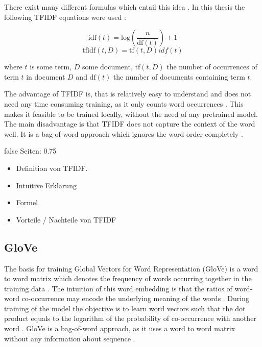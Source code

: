 \documentclass[draft,final,oneside]{vutinfth} %
\begin{document}
There exist many different formulas which entail this idea \cite{tfidf}. In this thesis the following TFIDF equations were used \cite{tfidf}:

\begin{equation}
\text{idf}(t) = \text{log} \left(\dfrac{n}{\text{df}(t)} \right) + 1
\end{equation}
\begin{equation}
\text{tfidf}(t, D) = \text{tf}(t, D)idf(t)
\end{equation}


where $t$ is some term, $D$ some document, $\text{tf}(t, D)$ the number of occurrences of term $t$ in document $D$ and $\text{df}(t)$ the number of documents containing term $t$.

The advantage of TFIDF is, that is relatively easy to understand and does not need any time consuming training, as it only counts word occurrences \cite{irsurvey}. This makes it feasible to be trained locally, without the need of any pretrained model. The main disadvantage is that TFIDF does not capture the context of the word well. It is a bag-of-word approach which ignores the word order completely \cite{irsurvey}.

\if false
Seiten: 0.75

\begin{itemize}
\item Definition von TFIDF. 
\item Intuitive Erklärung
\item Formel
\item Vorteile / Nachteile von TFIDF
\end{itemize}

\fi

\subsection{GloVe}
The basis for training Global Vectors for Word Representation (GloVe) is a word to word matrix which denotes the frequency of words occurring together in the training data \cite{glovepage}. The intuition of this word embedding is that the ratios of word-word co-occurrence may encode the underlying meaning of the words \cite{pennington2014glove}. During training of the model the objective is to learn word vectors such that the dot product equals to the logarithm of the probability of co-occurrence with another word \cite{pennington2014glove}. GloVe is a bag-of-word approach, as it uses a word to word matrix without any information about sequence \cite{pennington2014glove}.
\end{document}
